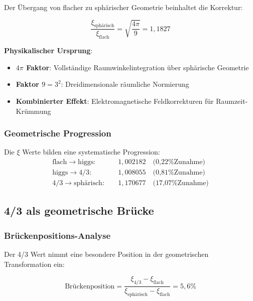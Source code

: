 \documentclass[12pt,a4paper]{article}
\newcommand{\xipar}{\ensuremath{\xi}}
\newcommand{\mypi}{\ensuremath{\pi}}
\newcommand{\myrightarrow}{\ensuremath{\rightarrow}}
\begin{document}
	Der Übergang von flacher zu sphärischer Geometrie beinhaltet die Korrektur:
	
	\begin{equation}
		\frac{\xipar_{\text{sphärisch}}}{\xipar_{\text{flach}}} = \sqrt{\frac{4\mypi}{9}} = 1,1827
		\label{eq:em_korrektur}
	\end{equation}
	
	\textbf{Physikalischer Ursprung}:
	\begin{itemize}
		\item \textbf{$4\mypi$ Faktor}: Vollständige Raumwinkelintegration über sphärische Geometrie
		\item \textbf{Faktor $9 = 3^2$}: Dreidimensionale räumliche Normierung
		\item \textbf{Kombinierter Effekt}: Elektromagnetische Feldkorrekturen für Raumzeit-Krümmung
	\end{itemize}
	
	\subsubsection{Geometrische Progression}
	\label{subsubsec:geometrische_progression}
	
	Die $\xi$ Werte bilden eine systematische Progression:
	\begin{align}
		\text{flach} \myrightarrow \text{higgs}: \quad &1,002182 \quad \text{(0,22\% Zunahme)} \\
		\text{higgs} \myrightarrow \text{4/3}: \quad &1,008055 \quad \text{(0,81\% Zunahme)} \\
		\text{4/3} \myrightarrow \text{sphärisch}: \quad &1,170677 \quad \text{(17,07\% Zunahme)}
	\end{align}
	
	\subsection{4/3 als geometrische Brücke}
	\label{subsec:vier_drittel_bruecke}
	
	\subsubsection{Brückenpositions-Analyse}
	\label{subsubsec:brueckenposition}
	
	Der 4/3 Wert nimmt eine besondere Position in der geometrischen Transformation ein:
	
	\begin{equation}
		\text{Brückenposition} = \frac{\xipar_{4/3} - \xipar_{\text{flach}}}{\xipar_{\text{sphärisch}} - \xipar_{\text{flach}}} = 5,6\%
		\label{eq:brueckenposition}
	\end{equation}
	
\end{document}
